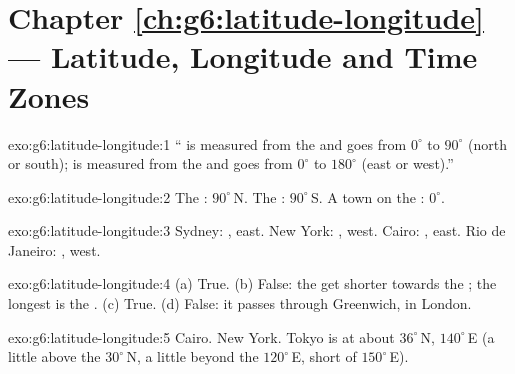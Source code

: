 \section*{Chapter \ref{ch:g6:latitude-longitude} --- Latitude, Longitude and Time Zones}

\begin{solution}{exo:g6:latitude-longitude:1}
`` is measured from the  and goes from $0^\circ$ to
$90^\circ$ (north or south);  is measured from the 
and goes from $0^\circ$ to $180^\circ$ (east or west).''
\end{solution}

\begin{solution}{exo:g6:latitude-longitude:2}
The : $90^\circ$\,N. The : $90^\circ$\,S. A town on the
: $0^\circ$.
\end{solution}

\begin{solution}{exo:g6:latitude-longitude:3}
Sydney: , east. New York: , west.
Cairo: , east. Rio de Janeiro: ,
west.
\end{solution}

\begin{solution}{exo:g6:latitude-longitude:4}
(a) True. (b) False: the  get shorter towards the ; the
longest is the . (c) True. (d) False: it passes through Greenwich,
in London.
\end{solution}

\begin{solution}{exo:g6:latitude-longitude:5}
Cairo. New York. Tokyo is at about $36^\circ$\,N, $140^\circ$\,E (a little
above the  $30^\circ$\,N, a little beyond the 
$120^\circ$\,E, short of $150^\circ$\,E).
\end{solution}

